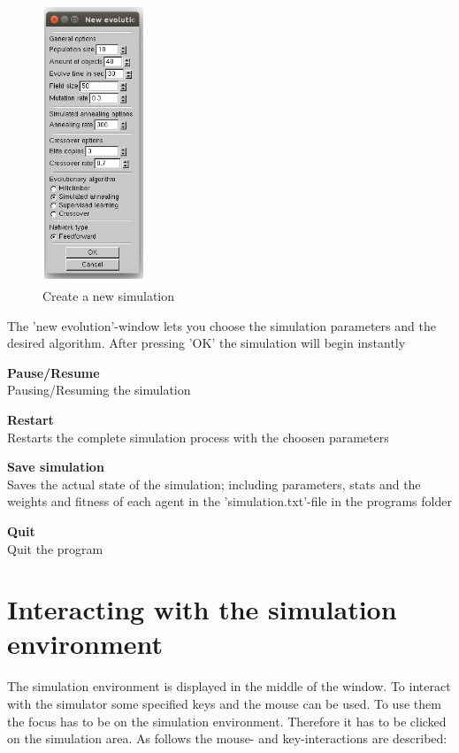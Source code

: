 \documentclass[10pt,a4paper,DIV=11]{scrreprt}
\begin{document}
\begin{LARGE}
\begin{center}
	\begin{figure}[H]
		\centering
		\includegraphics[width=0.28\textwidth,scale=1]{New_Evolution_menu.png}  
		\caption{Create a new simulation}
		\label{fig:evolution}
	\end{figure}
\end{center}

The 'new evolution'-window lets you choose the simulation parameters and the desired algorithm.
After pressing 'OK' the simulation will begin instantly

\textbf{Pause/Resume} \\ Pausing/Resuming the simulation

\textbf{Restart} \\Restarts the complete simulation process with the choosen parameters

\textbf{Save simulation} \\Saves the actual state of the simulation; including parameters, stats and the weights and fitness of each agent in the 'simulation.txt'-file in the programs folder

\textbf{Quit} \\
Quit the program

\newpage

\section{Interacting with the simulation environment}
The simulation environment is displayed in the middle of the window.
To interact with the simulator some specified keys and the mouse can be used. To use them the focus has to be on the simulation environment. Therefore it has to be clicked on the simulation area. As follows the mouse- and key-interactions are described: \\


\end{LARGE}
\end{document}
